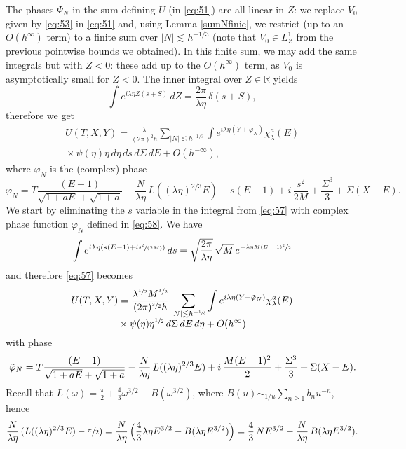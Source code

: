 \documentclass[JEP,XML,SOM,Unicode,NoEqCountersInSection,NoFloatCountersInSection,published]{cedram}
\newcommand{\spfrac}[2]{\sfrac{#1}{(#2)}}
\newcommand\R{{\mathbb R}}
\theoremstyle{plain}
\theoremstyle{definition}
\begin{document}
The phases $\Psi_N$ in the sum defining $U$ (in \eqref{eq:51}) are all linear in ${Z}$: we replace $V_0$ given by \eqref{eq:53} in \eqref{eq:51} and, using Lemma \ref{sumNfinie}, we restrict (up to an $O(h^{\infty})$ term) to a finite sum over $|N|\lesssim h^{-1/3}$ (note that $V_{0}\in L^{1}_{Z}$ from the previous pointwise bounds we obtained). In this finite sum, we may add the same integrals but with $Z<0$: these add up to the $O(h^{\infty})$ term, as $V_{0}$ is asymptotically small for $Z<0$. The inner integral over ${Z}\in \R$ yields
\[
\int e^{i\lambda \eta {Z}(s+S)}\,dZ= \frac{2\pi}{\lambda \eta}\, \delta(s+S),
\]
therefore we get
\begin{multline}
\label{eq:57}
U(T,X,Y)
=\frac{\lambda}{(2\pi)^{2}h} \sum_{|N|\lesssim h^{-1/3}} \int e^{i\lambda \eta(Y+\varphi_{N})} \chi_{\lambda}^{a}(E)\\[-5pt]
{}\times\psi(\eta) \eta \,d\eta \,ds \,d\Sigma \,dE+O({h^{-\infty}}),
\end{multline}
where $\varphi_{N}$ is the (complex) phase
\begin{equation}
\label{eq:58}
\varphi_{N}= T \frac{(E-1)}{ \sqrt{1+aE}+\sqrt{1+a}} - \frac N {\lambda \eta}\, L((\lambda \eta)^{2/3} E)+s (E-1) + i\, \frac {s^{2}}{2M} +\frac{\Sigma^{3}} 3+ \Sigma (X-E).
\end{equation}
We start by eliminating the $s$ variable in the integral from \eqref{eq:57} with complex phase function $\varphi_N$ defined in \eqref{eq:58}. We have
\begin{equation*}
\label{eq:61}
\int e^{i\lambda \eta (s(E-1)+i\spfrac {s^{2}}{2M})}
\,ds= \sqrt{\frac{2\pi}{\lambda\eta}}\, \sqrt M\, e^{-\sfrac{\lambda\eta M(E-1)^{2}}{2}}
\end{equation*}
and therefore \eqref{eq:57} becomes
\begin{multline}
\label{eq:62}
U(T,X,Y)=\frac{\lambda^{\sfrac 12}M^{\sfrac 12}}{ (2\pi)^{\sfrac 32}h}\sum_{|N|\lesssim h^{-\sfrac 13}}\int e^{i\lambda \eta(Y+\tilde\varphi_{N})} \chi_{\lambda}^{a }(E)\\[-5pt]
{}\times\psi(\eta)\eta^{\sfrac 12} \,d\Sigma \,dE \,d\eta+O(h^{\infty})
\end{multline}
with phase
\begin{equation}
\label{eq:63}
\tilde\varphi_{N} = T \frac{(E-1)}{ \sqrt{1+aE}+\sqrt{1+a}} - \frac N {\lambda \eta}\, L((\lambda \eta)^{2/3} E)\\{}+ i\, \frac {M(E-1)^{2}}{2} +\frac{\Sigma^{3}} 3+ \Sigma (X-E).
\end{equation}
Recall that $L(\omega)=\frac\pi 2 + \frac 43 \omega^{3/2}-B(\omega^{3/2})$, where $B(u)\sim_{1/u}\sum_{n\geq 1} b_{n}u^{-n}$, hence
\[
\frac N {\lambda \eta}\, (L((\lambda \eta)^{2/3} E)-\sfrac \pi 2)=\frac N {\lambda \eta}\, \Bigl(\frac 43 \lambda\eta E^{3/2}-B(\lambda\eta E^{3/2})\Bigr)=\frac 43\, NE^{3/2}-\frac N {\lambda \eta}\,B(\lambda\eta E^{3/2}).
\]
\end{document}
